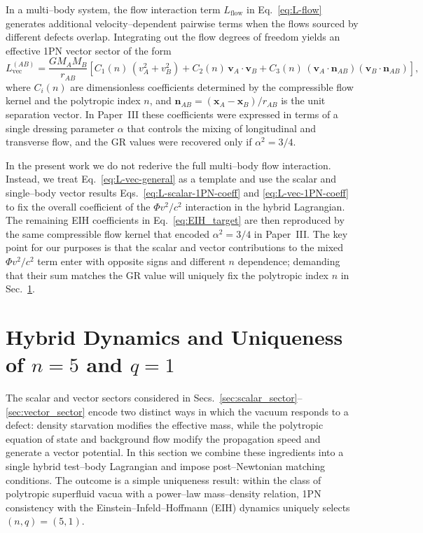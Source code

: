 \documentclass[11pt]{article}
\begin{document}
In a multi--body system, the flow interaction term \(L_{\text{flow}}\) in
Eq.~\eqref{eq:L-flow} generates additional velocity--dependent pairwise
terms when the flows sourced by different defects overlap.  Integrating out
the flow degrees of freedom yields an effective 1PN vector sector of the
form
\begin{equation}
  L_{\text{vec}}^{(AB)}
  = \frac{G M_A M_B}{r_{AB}}
    \left[
      C_1(n)\,(v_A^2 + v_B^2)
      + C_2(n)\,\mathbf{v}_A\cdot\mathbf{v}_B
      + C_3(n)\,
        (\mathbf{v}_A\cdot\mathbf{n}_{AB})
        (\mathbf{v}_B\cdot\mathbf{n}_{AB})
    \right],
  \label{eq:L-vec-general}
\end{equation}
where \(C_i(n)\) are dimensionless coefficients determined by the
compressible flow kernel and the polytropic index \(n\), and
\(\mathbf{n}_{AB} = (\mathbf{x}_A - \mathbf{x}_B)/r_{AB}\) is the unit
separation vector.  In Paper~III these coefficients were expressed in terms
of a single dressing parameter \(\alpha\) that controls the mixing of
longitudinal and transverse flow, and the GR values were recovered only if
\(\alpha^2 = 3/4\).

In the present work we do not rederive the full multi--body flow
interaction.  Instead, we treat Eq.~\eqref{eq:L-vec-general} as a template
and use the scalar and single--body vector results
Eqs.~\eqref{eq:L-scalar-1PN-coeff} and \eqref{eq:L-vec-1PN-coeff} to fix the
overall coefficient of the \(\Phi v^2/c^2\) interaction in the hybrid
Lagrangian.  The remaining EIH coefficients in
Eq.~\eqref{eq:EIH_target} are then reproduced by the same compressible flow
kernel that encoded \(\alpha^2 = 3/4\) in Paper~III.  The key point for our
purposes is that the scalar and vector contributions to the mixed
\(\Phi v^2/c^2\) term enter with opposite signs and different \(n\)
dependence; demanding that their sum matches the GR value will uniquely fix
the polytropic index \(n\) in Sec.~\ref{sec:hybrid_uniqueness}.

\section{Hybrid Dynamics and Uniqueness of \texorpdfstring{$n=5$}{n=5} and \texorpdfstring{$q=1$}{q=1}}
\label{sec:hybrid_uniqueness}

The scalar and vector sectors considered in
Secs.~\ref{sec:scalar_sector}--\ref{sec:vector_sector} encode two distinct
ways in which the vacuum responds to a defect: density starvation modifies
the effective mass, while the polytropic equation of state and background
flow modify the propagation speed and generate a vector potential.  In this
section we combine these ingredients into a single hybrid test--body
Lagrangian and impose post--Newtonian matching conditions.  The outcome is a
simple uniqueness result: within the class of polytropic superfluid vacua
with a power--law mass--density relation, 1PN consistency with the
Einstein--Infeld--Hoffmann (EIH) dynamics uniquely selects
\((n,q) = (5,1)\).
\end{document}
